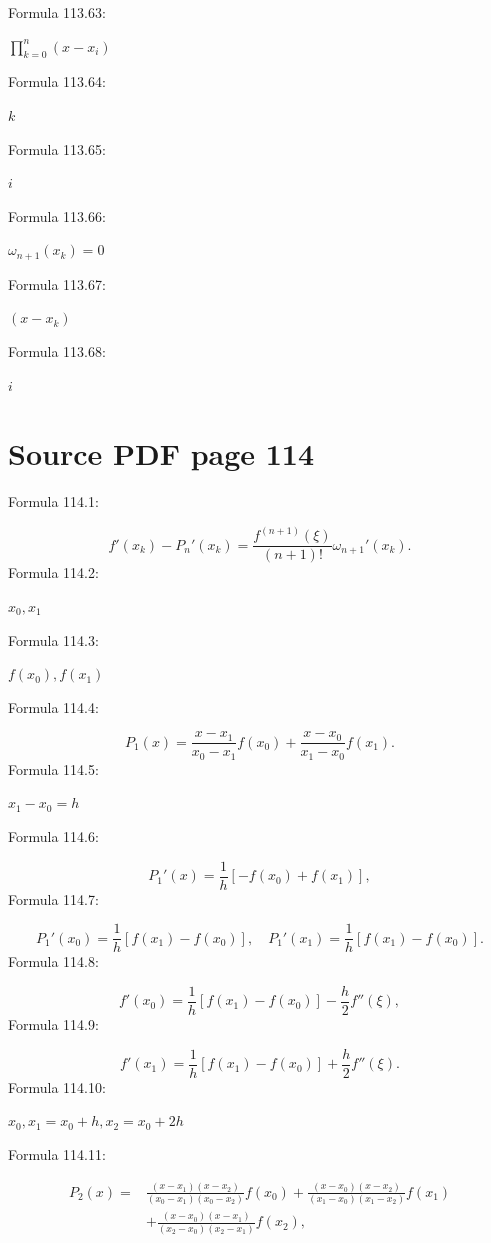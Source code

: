 \documentclass[11pt]{article}
\begin{document}
\noindent Formula 113.63:\par
$\prod_{k=0}^{n}(x-x_i)$\par
\noindent Formula 113.64:\par
$k$\par
\noindent Formula 113.65:\par
$i$\par
\noindent Formula 113.66:\par
$\omega_{n+1}(x_k)=0$\par
\noindent Formula 113.67:\par
$(x-x_k)$\par
\noindent Formula 113.68:\par
$i$\par
\clearpage
\section*{Source PDF page 114}
\noindent Formula 114.1:\par
\[
f'(x_k)-P_n'(x_k)=\frac{f^{(n+1)}(\xi)}{(n+1)!}\omega_{n+1}'(x_k).
\tag{4.5.2}
\]
\noindent Formula 114.2:\par
$x_0,x_1$\par
\noindent Formula 114.3:\par
$f(x_0),f(x_1)$\par
\noindent Formula 114.4:\par
\[
P_1(x)=\frac{x-x_1}{x_0-x_1}f(x_0)+\frac{x-x_0}{x_1-x_0}f(x_1).
\]
\noindent Formula 114.5:\par
$x_1-x_0=h$\par
\noindent Formula 114.6:\par
\[
P_1'(x)=\frac1h[-f(x_0)+f(x_1)],
\]
\noindent Formula 114.7:\par
\[
P_1'(x_0)=\frac1h[f(x_1)-f(x_0)],\quad
P_1'(x_1)=\frac1h[f(x_1)-f(x_0)].
\]
\noindent Formula 114.8:\par
\[
f'(x_0)=\frac1h[f(x_1)-f(x_0)]-\frac h2f''(\xi),
\]
\noindent Formula 114.9:\par
\[
f'(x_1)=\frac1h[f(x_1)-f(x_0)]+\frac h2f''(\xi).
\]
\noindent Formula 114.10:\par
$x_0,x_1=x_0+h,x_2=x_0+2h$\par
\noindent Formula 114.11:\par
\[
\begin{aligned}
P_2(x)={}&\frac{(x-x_1)(x-x_2)}{(x_0-x_1)(x_0-x_2)}f(x_0)
+\frac{(x-x_0)(x-x_2)}{(x_1-x_0)(x_1-x_2)}f(x_1)\\
&+\frac{(x-x_0)(x-x_1)}{(x_2-x_0)(x_2-x_1)}f(x_2),
\end{aligned}
\]
\end{document}

